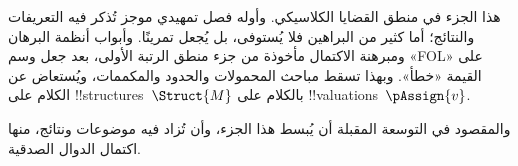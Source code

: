 \documentclass[../../include/open-logic-part]{subfiles}
\begin{document}

\begin{editorial}
  هذا الجزء في منطق القضايا الكلاسيكي. وأوله فصل تمهيدي موجز تُذكر فيه التعريفات والنتائج؛ أما كثير من البراهين فلا يُستوفى، بل يُجعل تمرينًا. وأبواب أنظمة البرهان ومبرهنة الاكتمال مأخوذة من جزء منطق الرتبة الأولى، بعد جعل وسم «FOL» على القيمة «خطأ». وبهذا تسقط مباحث المحمولات والحدود والمكممات، ويُستعاض عن الكلام على
  !!{structure}s~$\Struct{M}$ بالكلام على
  !!{valuation}s~$\pAssign{v}$.

  والمقصود في التوسعة المقبلة أن يُبسط هذا الجزء، وأن تُزاد فيه موضوعات ونتائج، منها اكتمال الدوال الصدقية.
\end{editorial}










\OLEndPartHook
\end{document}

